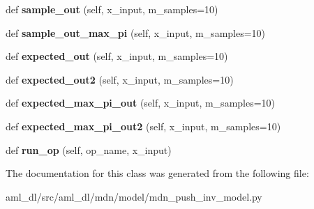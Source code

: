 \begin{DoxyCompactItemize}
def {\bfseries sample\+\_\+out} (self, x\+\_\+input, m\+\_\+samples=10)
\item 
\hypertarget{classsrc_1_1aml__dl_1_1mdn_1_1model_1_1mdn__push__inv__model_1_1_m_d_n_push_inverse_model_a2d4f64d96bebc2aa6728b6de026623c9}{}\label{classsrc_1_1aml__dl_1_1mdn_1_1model_1_1mdn__push__inv__model_1_1_m_d_n_push_inverse_model_a2d4f64d96bebc2aa6728b6de026623c9} 
def {\bfseries sample\+\_\+out\+\_\+max\+\_\+pi} (self, x\+\_\+input, m\+\_\+samples=10)
\item 
\hypertarget{classsrc_1_1aml__dl_1_1mdn_1_1model_1_1mdn__push__inv__model_1_1_m_d_n_push_inverse_model_af24b4f077df4aba9b40a26563b39ca44}{}\label{classsrc_1_1aml__dl_1_1mdn_1_1model_1_1mdn__push__inv__model_1_1_m_d_n_push_inverse_model_af24b4f077df4aba9b40a26563b39ca44} 
def {\bfseries expected\+\_\+out} (self, x\+\_\+input, m\+\_\+samples=10)
\item 
\hypertarget{classsrc_1_1aml__dl_1_1mdn_1_1model_1_1mdn__push__inv__model_1_1_m_d_n_push_inverse_model_a72bdc8d20fdd2dcfdc83eb363b465ef9}{}\label{classsrc_1_1aml__dl_1_1mdn_1_1model_1_1mdn__push__inv__model_1_1_m_d_n_push_inverse_model_a72bdc8d20fdd2dcfdc83eb363b465ef9} 
def {\bfseries expected\+\_\+out2} (self, x\+\_\+input, m\+\_\+samples=10)
\item 
\hypertarget{classsrc_1_1aml__dl_1_1mdn_1_1model_1_1mdn__push__inv__model_1_1_m_d_n_push_inverse_model_a041d9896a8ecafcf90b68e9d2694627a}{}\label{classsrc_1_1aml__dl_1_1mdn_1_1model_1_1mdn__push__inv__model_1_1_m_d_n_push_inverse_model_a041d9896a8ecafcf90b68e9d2694627a} 
def {\bfseries expected\+\_\+max\+\_\+pi\+\_\+out} (self, x\+\_\+input, m\+\_\+samples=10)
\item 
\hypertarget{classsrc_1_1aml__dl_1_1mdn_1_1model_1_1mdn__push__inv__model_1_1_m_d_n_push_inverse_model_a854d79e3467c5be8312d3a73ef0b75ec}{}\label{classsrc_1_1aml__dl_1_1mdn_1_1model_1_1mdn__push__inv__model_1_1_m_d_n_push_inverse_model_a854d79e3467c5be8312d3a73ef0b75ec} 
def {\bfseries expected\+\_\+max\+\_\+pi\+\_\+out2} (self, x\+\_\+input, m\+\_\+samples=10)
\item 
\hypertarget{classsrc_1_1aml__dl_1_1mdn_1_1model_1_1mdn__push__inv__model_1_1_m_d_n_push_inverse_model_a9ff89e2b0ea4275235cb7fd467dc2ab4}{}\label{classsrc_1_1aml__dl_1_1mdn_1_1model_1_1mdn__push__inv__model_1_1_m_d_n_push_inverse_model_a9ff89e2b0ea4275235cb7fd467dc2ab4} 
def {\bfseries run\+\_\+op} (self, op\+\_\+name, x\+\_\+input)
\end{DoxyCompactItemize}


The documentation for this class was generated from the following file\+:\begin{DoxyCompactItemize}
\item 
aml\+\_\+dl/src/aml\+\_\+dl/mdn/model/mdn\+\_\+push\+\_\+inv\+\_\+model.\+py\end{DoxyCompactItemize}
